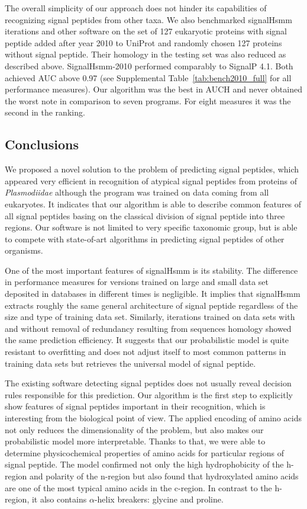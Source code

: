 \documentclass[10pt,letterpaper]{article}
\begin{document}
The overall simplicity of our approach does not hinder its capabilities of recognizing signal peptides from other taxa. We also benchmarked signalHsmm iterations and other software on the set of 127 eukaryotic proteins with signal peptide added after year 2010 to UniProt and randomly chosen 127 proteins without signal peptide. Their homology in the testing set was also reduced as described above. SignalHsmm-2010 performed comparably to SignalP 4.1. Both achieved AUC above 0.97 (see Supplemental Table~\ref{tab:bench2010_full} for all performance measures). Our algorithm was the best in AUCH and never obtained the worst note in comparison to seven programs. For eight measures it was the second in the ranking.

\subsection*{Conclusions}

We proposed a novel solution to the problem of predicting signal peptides, which appeared very efficient in recognition of atypical signal peptides from proteins of \textit{Plasmodiidae} although the program was trained on data coming from all eukaryotes. It indicates that our algorithm is able to describe common features of all signal peptides basing on the classical division of signal peptide into three regions. Our software is not limited to very specific taxonomic group, but is able to compete with state-of-art algorithms in predicting signal peptides of other organisms.

One of the most important features of signalHsmm is its stability. The difference in performance measures for versions trained on large and small data set deposited in databases in different times is negligible. It implies that signalHsmm extracts roughly the same general architecture of signal peptide regardless of the size and type of training data set. Similarly, iterations trained on data sets with and without removal of redundancy resulting from sequences homology showed the same prediction efficiency. It suggests that our probabilistic model is quite resistant to overfitting and does not adjust itself to most common patterns in training data sets but retrieves the universal model of signal peptide.

The existing software detecting signal peptides does not usually reveal decision rules responsible for this prediction. Our algorithm is the first step to explicitly show features of signal peptides important in their recognition, which is interesting from the biological point of view. The applied encoding of amino acids not only reduces the dimensionality of the problem, but also makes our probabilistic model more interpretable. Thanks to that, we were able to determine physicochemical properties of amino acids for particular regions of signal peptide. The model confirmed not only the high hydrophobicity of the h-region and polarity of the n-region but also found that hydroxylated amino acids are one of the most typical amino acids in the c-region. In contrast to the h-region, it also contains  $\alpha$-helix breakers: glycine and proline.
\end{document}
